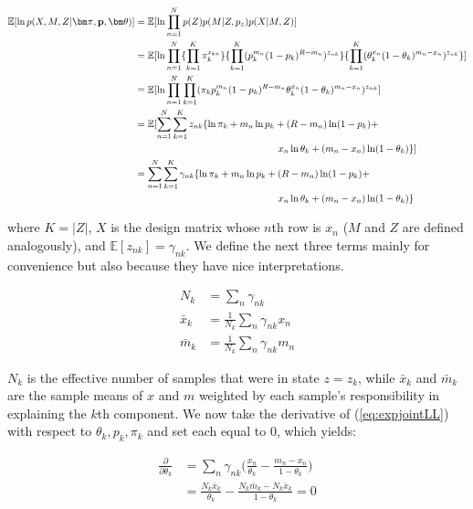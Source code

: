 \documentclass[a4paper]{article}
\newcommand{\vp}{{\bf p}}
\newcommand{\vpi}{{\bm \pi}}
\newcommand{\vtheta}{{\bm \theta}}
\newcommand{\E}{\mathbb{E}}
\begin{document}
\begin{align}
\E [ \ln p(X, M , Z | \vpi, \vp, \vtheta) ] &= \E [ \ln \prod_{n = 1}^{N}  p(Z) p(M | Z, p_{z} ) p(X | M, Z ) ] \nonumber \\
							&= \E [ \ln \prod_{n = 1}^{N} \{ \prod_{k = 1}^{K} \pi_k^{z_{kn}} \} \{ \prod_{k = 1}^{K} ( p_k^{m_n} (1-p_k)^{R - m_n} ) ^{z_{nk}} \} \{ \prod_{k = 1}^{K} ( \theta_k^{x_n} (1 - \theta_k)^{m_n - x_n} )^{z_{nk}} \} ] \notag \\
							&= \E [ \ln \prod_{n = 1}^{N} \prod_{k = 1}^{K} ( \pi_k  p_{k}^{m_n} (1-p_k)^{R - m_n} \theta_k^{x_n} (1 - \theta_k)^{m_n - x_n} )^{z_{nk}} ]  \nonumber \\
							&= \E [ \sum_{n = 1}^{N} \sum_{k = 1}^{K} z_{nk} \{ \ln \pi_k  + m_n \ln p_k + (R - m_n) \ln (1-p_k) + \notag \\
							&\phantom{---------------} x_n \ln \theta_k + (m_n - x_n) \ln (1 - \theta_k) \} ]  \nonumber \\
							&= \sum_{n = 1}^{N} \sum_{k = 1}^{K} \gamma_{nk} \{ \ln \pi_k  + m_n \ln p_k + (R - m_n) \ln (1-p_k) + \notag \\
						    &\phantom{---------------} x_n \ln \theta_k + (m_n - x_n) \ln (1 - \theta_k) \label{eq:expjointLL} \}
\end{align} 

where $K = |Z|$, $X$ is the design matrix whose $n$th row is $x_n$ ($M$ and $Z$ are defined analogously), and $\E [ z_{nk} ] = \gamma_{nk}$. We define the next three terms mainly for convenience but also because they have nice interpretations.

\begin{align}
N_k      &= \sum_n \gamma_{nk} \label{eq:nk} \\
\bar{x}_k  &= \frac{1}{N_k} \sum_n \gamma_{nk} x_n \label{eq:xbar} \\
\bar{m}_k &= \frac{1}{N_k} \sum_n \gamma_{nk} m_n \label{eq:mbar}
\end{align}

$N_k$ is the effective number of samples that were in state $z = z_k$, while $\bar{x}_k$ and $\bar{m}_k$ are the sample means of $x$ and $m$ weighted by each sample's responsibility in explaining the $k$th component. We now take the derivative of (\ref{eq:expjointLL}) with respect to $\theta_k, p_k, \pi_k$ and set each equal to 0, which yields:

\begin{align}
\frac{\partial}{\partial \theta_k} &= \sum_n \gamma_{nk} \Big( \frac{ x_n}{\theta_k} - \frac{m_n - x_n}{1- \theta_k} \Big)\\
					      &= \frac{N_k \bar{x}_k}{\theta_k} - \frac{N_k \bar{m}_k - N_k \bar{x}_k}{1- \theta_k} = 0
\end{align}
\end{document}
